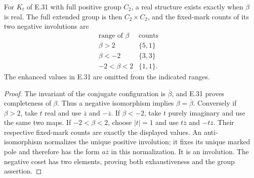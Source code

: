 For $K_t$ of E.31 with full positive group $C_2$, a real structure
exists exactly when $\beta$ is real.  The full extended group is
then $C_2\times C_2$, and the fixed-mark counts of its two negative
involutions are
\[
\begin{array}{c|c}
 \text{range of }\beta&\text{counts}\\\hline
 \beta>2&\{5,1\}\\
 \beta<-2&\{3,3\}\\
 -2<\beta<2&\{1,1\}.
\end{array}
\]
The enhanced values in E.31 are omitted from the indicated ranges.
\begin{proof}
The invariant of the conjugate configuration is $\overline\beta$,
and E.31 proves completeness of $\beta$.  Thus a negative
isomorphism implies $\beta=\overline\beta$.  Conversely if
$\beta>2$, take $t$ real and use $\overline z$ and
$-\overline z$.  If $\beta<-2$, take $t$ purely imaginary and
use the same two maps.  If $-2<\beta<2$, choose $|t|=1$ and use
$t\overline z$ and $-t\overline z$.  Their respective fixed-mark
counts are exactly the displayed values.  An anti-isomorphism
normalizes the unique positive involution; it fixes its unique
marked pole and therefore has the form $a\overline z$ in this
normalization.  It is an involution.  The negative coset has two
elements, proving both exhaustiveness and the group assertion.
\end{proof}

